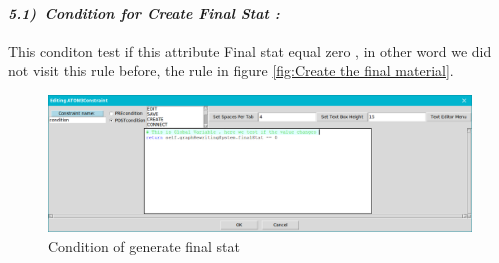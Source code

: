 \paragraph{\emph{5.1)~Condition for Create Final Stat : } } 
This conditon test if this attribute Final stat equal zero 
, in other word we did not visit this rule before, the rule in figure  \ref{fig:Create the final material}.
 \vspace{1cm} 
\begin{figure}[th]
	\centering
 	\includegraphics[scale=0.37]{ch3/img/condfinal}
	\caption{\label{fig:Condition of generate final stat } Condition of generate final stat }
\end{figure} 

